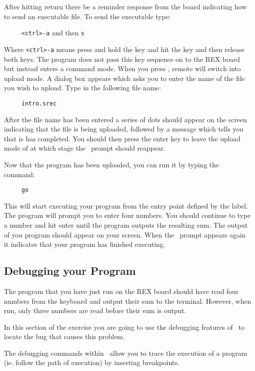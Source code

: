 After hitting return there be a reminder response from the board indicating 
how to send an executable file. To send the executable type:

\verb|     <ctrl>-a| and then \verb|s|

Where \verb|<ctrl>-a| means press and hold the  key and hit 
the  key and then release both keys.
The  program does not pass this key sequence on to the REX 
board but instead enters a command
mode. When you press , remote will switch into upload mode. A
dialog box appears which asks you to enter the name of the file you wish to 
upload. Type in the following file name:
\begin{verbatim}
     intro.srec
\end{verbatim}

After the file name has been entered a series of dots should appear on the 
screen indicating that the file is being
uploaded, followed by a message which tells you that is has completed. You 
should then press the enter key to
leave the upload mode of  at which stage the \WRAMPmon\ prompt 
should reappear.

Now that the program has been uploaded, you can run it by typing the command:
\begin{verbatim}
     go
\end{verbatim}

This will start executing your program from the entry point defined by the 
 label. The program will
prompt you to enter four numbers. You should continue to type a number and 
hit enter until the program
outputs the resulting sum. The output of you program should appear on your 
screen. When the \WRAMPmon\
prompt appears again it indicates that your program has finished executing.


\subsection{Debugging your Program}
The program that you have just run on the REX board should have read four 
numbers from the keyboard and
output their sum to the terminal. However, when run, only three numbers
are read before their sum is output.

In this section of the exercise you are going to use the debugging 
features of \WRAMPmon\ to locate the bug that
causes this problem.

The debugging commands within \WRAMPmon\ allow you to trace the execution 
of a program (ie. follow the path
of execution) by inserting breakpoints.


